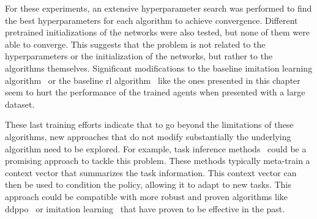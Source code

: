 For these experiments, an extensive hyperparameter search was performed to find the best hyperparameters for each algorithm to achieve convergence.
Different pretrained initializations of the networks were also tested, but none of them were able to converge.
This suggests that the problem is not related to the hyperparameters or the initialization of the networks, but rather to the algorithms themselves.
Significant modifications to the baseline imitation learning algorithm~\cite{ramrakhya2023} or the baseline \acrshort{rl} algorithm~\cite{wijmans2020} like the ones presented in this chapter seem to hurt the performance of the trained agents when presented with a large dataset.

These last training efforts indicate that to go beyond the limitations of these algorithms, new approaches that do not modify substantially the underlying algorithm need to be explored.
For example, task inference methods~\cite{Beck_2025} could be a promising approach to tackle this problem.
These methods typically meta-train a context vector that summarizes the task information.
This context vector can then be used to condition the policy, allowing it to adapt to new tasks.
This approach could be compatible with more robust and proven algorithms like \acrshort{ddppo}~\cite{wijmans2020} or imitation learning~\cite{ramrakhya2023} that have proven to be effective in the past.